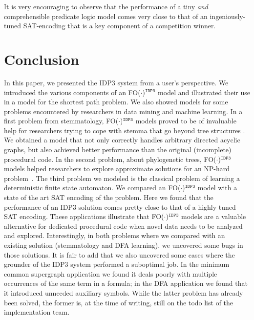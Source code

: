 \documentclass{tlp}
\newcommand{\idpdrie}{{\sc IDP3}\xspace}
\newcommand{\fodotidp}{{\sc FO($\cdot$)$^{\mathtt{IDP3}}$}\xspace}
\renewcommand{\|}{\ensuremath{\,|\,}}
\newcommand{\todo}[1]{\textcolor{blue}{TODO: #1}}
\renewcommand{\|}{\,|\,}
\begin{document}
It is very encouraging to observe that the performance of a tiny \emph{and}
comprehensible predicate logic model comes very close to that of an
ingeniously-tuned SAT-encoding that is a key component of a
competition winner.



\section{Conclusion}\label{sec:concl}

In this paper, we presented the \idpdrie system from a user's
perspective. We introduced the various components of an \fodotidp
model and illustrated their use in a model for the shortest path
problem. We also showed models for some problems encountered by
researchers in data mining and machine learning.  In a first problem
from stemmatology, \fodotidp models proved to be of invaluable help
for researchers trying to cope with stemma that go beyond tree
structures \cite{Andrewsetal12}. We obtained a model that not only
correctly handles arbitrary directed acyclic graphs, but also achieved
better performance than the original (incomplete) procedural code. In
the second problem, about phylogenetic trees, \fodotidp models helped
researchers to explore approximate solutions for an NP-hard
problem~\cite{ump}. The third problem we modeled is the classical
problem of learning a deterministic finite state automaton. We
compared an \fodotidp model with a state of the art SAT encoding of
the problem. Here we found that the performance of an \idpdrie
solution comes pretty close to that of a highly tuned SAT encoding.
These applications illustrate that \fodotidp models are a valuable
alternative for dedicated procedural code when novel data needs to be
analyzed and explored. Interestingly, in both problems where we
compared with an existing solution (stemmatology and DFA learning), we
uncovered some bugs in those solutions. It is fair to add that we also
uncovered some cases where the grounder of the \idpdrie system performed 
a suboptimal job. In the minimum common
supergraph application we found it deals poorly with multiple
occurrences of the same term in a formula; in the DFA application we
found that it introduced unneeded auxiliary symbols. While the latter
problem has already been solved, the former is, at the time of
writing, still on the todo list of the implementation team.

\end{document}
